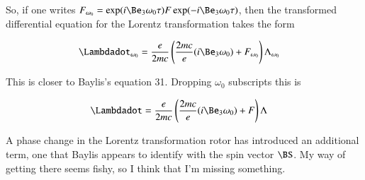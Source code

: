 \documentclass{article}
\begin{document}
So, if one writes $F_{\omega_0} = \exp( i \Be_3 \omega_0 \tau) F \exp( -i \Be_3 \omega_0 \tau)$, then
the transformed differential equation for the Lorentz transformation takes the form 

\begin{align*}
\Lambdadot_{\omega_0}
&=
\frac{e}{2 m c} \left(
\frac{2 m c}{e} ( i \Be_3 \omega_0 ) 
+ 
F_{\omega_0}
\right)
\Lambda_{\omega_0} 
\end{align*}

This is closer to Baylis's equation 31.
Dropping $\omega_0$ subscripts this is

\begin{align*}
\Lambdadot
&=
\frac{e}{2 m c} \left(
\frac{2 m c}{e} ( i \Be_3 \omega_0 ) 
+ 
F
\right)
\Lambda
\end{align*}

A phase change in the Lorentz transformation rotor has introduced an additional term, one that 
Baylis appears to identify with the spin vector $\BS$.  My way of getting there seems fishy, so I think that 
I'm missing something.



\end{document}

